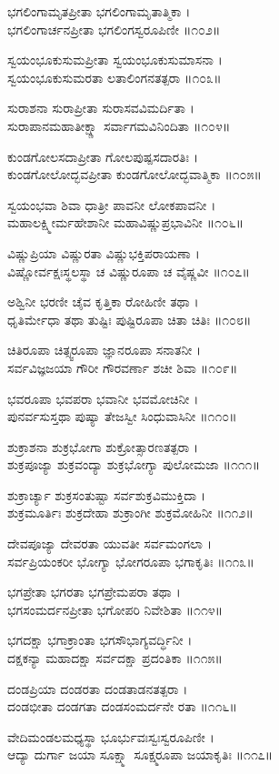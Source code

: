 ಭಗಲಿಂಗಾಮೃತಪ್ರೀತಾ ಭಗಲಿಂಗಾಮೃತಾತ್ಮಿಕಾ ।\\
ಭಗಲಿಂಗಾರ್ಚನಪ್ರೀತಾ ಭಗಲಿಂಗಸ್ವರೂಪಿಣೀ ॥೧೦೨॥

ಸ್ವಯಂಭೂಕುಸುಮಪ್ರೀತಾ ಸ್ವಯಂಭೂಕುಸುಮಾಸನಾ ।\\
ಸ್ವಯಂಭೂಕುಸುಮರತಾ ಲತಾಲಿಂಗನತತ್ಪರಾ ॥೧೦೩॥

ಸುರಾಶನಾ ಸುರಾಪ್ರೀತಾ ಸುರಾಸವವಿಮರ್ದಿತಾ ।\\
ಸುರಾಪಾನಮಹಾತೀಕ್ಷ್ಣಾ ಸರ್ವಾಗಮವಿನಿಂದಿತಾ ॥೧೦೪॥

ಕುಂಡಗೋಲಸದಾಪ್ರೀತಾ ಗೋಲಪುಷ್ಪಸದಾರತಿಃ ।\\
ಕುಂಡಗೋಲೋದ್ಭವಪ್ರೀತಾ ಕುಂಡಗೋಲೋದ್ಭವಾತ್ಮಿಕಾ ॥೧೦೫॥

ಸ್ವಯಂಭವಾ ಶಿವಾ ಧಾತ್ರೀ ಪಾವನೀ ಲೋಕಪಾವನೀ ।\\
ಮಹಾಲಕ್ಷ್ಮೀರ್ಮಹೇಶಾನೀ ಮಹಾವಿಷ್ಣುಪ್ರಭಾವಿನೀ ॥೧೦೬॥

ವಿಷ್ಣುಪ್ರಿಯಾ ವಿಷ್ಣುರತಾ ವಿಷ್ಣುಭಕ್ತಿಪರಾಯಣಾ ।\\
ವಿಷ್ಣೋರ್ವಕ್ಷಃಸ್ಥಲಸ್ಥಾ ಚ ವಿಷ್ಣುರೂಪಾ ಚ ವೈಷ್ಣವೀ ॥೧೦೭॥

ಅಶ್ವಿನೀ ಭರಣೀ ಚೈವ ಕೃತ್ತಿಕಾ ರೋಹಿಣೀ ತಥಾ ।\\
ಧೃತಿರ್ಮೇಧಾ ತಥಾ ತುಷ್ಟಿಃ ಪುಷ್ಟಿರೂಪಾ ಚಿತಾ ಚಿತಿಃ ॥೧೦೮॥

ಚಿತಿರೂಪಾ ಚಿತ್ಸ್ವರೂಪಾ ಜ್ಞಾನರೂಪಾ ಸನಾತನೀ ।\\
ಸರ್ವವಿಜ್ಞಜಯಾ ಗೌರೀ ಗೌರವರ್ಣಾ ಶಚೀ ಶಿವಾ ॥೧೦೯॥

ಭವರೂಪಾ ಭವಪರಾ ಭವಾನೀ ಭವಮೋಚಿನೀ ।\\
ಪುನರ್ವಸುಸ್ತಥಾ ಪುಷ್ಯಾ ತೇಜಸ್ವೀ ಸಿಂಧುವಾಸಿನೀ ॥೧೧೦॥

ಶುಕ್ರಾಶನಾ ಶುಕ್ರಭೋಗಾ ಶುಕ್ರೋತ್ಸಾರಣತತ್ಪರಾ ।\\
ಶುಕ್ರಪೂಜ್ಯಾ ಶುಕ್ರವಂದ್ಯಾ ಶುಕ್ರಭೋಗ್ಯಾ ಪುಲೋಮಜಾ ॥೧೧೧॥

ಶುಕ್ರಾರ್ಚ್ಯಾ ಶುಕ್ರಸಂತುಷ್ಟಾ ಸರ್ವಶುಕ್ರವಿಮುಕ್ತಿದಾ ।\\
ಶುಕ್ರಮೂರ್ತಿಃ ಶುಕ್ರದೇಹಾ ಶುಕ್ರಾಂಗೀ ಶುಕ್ರಮೋಹಿನೀ ॥೧೧೨॥

ದೇವಪೂಜ್ಯಾ ದೇವರತಾ ಯುವತೀ ಸರ್ವಮಂಗಲಾ ।\\
ಸರ್ವಪ್ರಿಯಂಕರೀ ಭೋಗ್ಯಾ ಭೋಗರೂಪಾ ಭಗಾಕೃತಿಃ ॥೧೧೩॥

ಭಗಪ್ರೇತಾ ಭಗರತಾ ಭಗಪ್ರೇಮಪರಾ ತಥಾ ।\\
ಭಗಸಂಮರ್ದನಪ್ರೀತಾ ಭಗೋಪರಿ ನಿವೇಶಿತಾ ॥೧೧೪॥

ಭಗದಕ್ಷಾ ಭಗಾಕ್ರಾಂತಾ ಭಗಸೌಭಾಗ್ಯವರ್ದ್ಧಿನೀ ।\\
ದಕ್ಷಕನ್ಯಾ ಮಹಾದಕ್ಷಾ ಸರ್ವದಕ್ಷಾ ಪ್ರದಂತಿಕಾ ॥೧೧೫॥

ದಂಡಪ್ರಿಯಾ ದಂಡರತಾ ದಂಡತಾಡನತತ್ಪರಾ ।\\
ದಂಡಭೀತಾ ದಂಡಗತಾ ದಂಡಸಂಮರ್ದನೇ ರತಾ ॥೧೧೬॥

ವೇದಿಮಂಡಲಮಧ್ಯಸ್ಥಾ ಭೂರ್ಭುವಃಸ್ವಃಸ್ವರೂಪಿಣೀ ।\\
ಆದ್ಯಾ ದುರ್ಗಾ ಜಯಾ ಸೂಕ್ಷ್ಮಾ ಸೂಕ್ಷ್ಮರೂಪಾ ಜಯಾಕೃತಿಃ ॥೧೧೭॥

